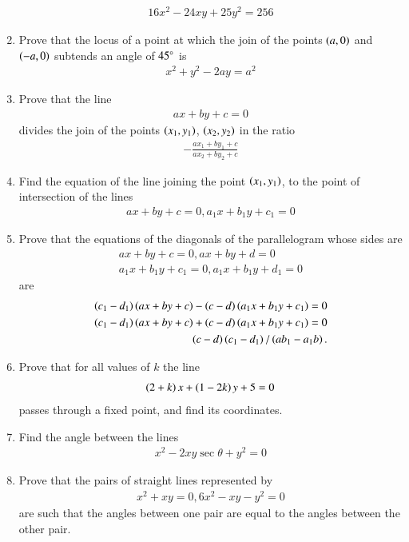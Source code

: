 \begin{enumerate}[1.]
\begin{align*}
16x^2-24xy+25y^2 = 256
\end{align*}
\item Prove that the locus of a point at which the join of the points $\left(a,0\right)$ and $\left(-a,0\right)$ subtends an angle of $45\degree$ is
\begin{align*}
x^2+y^2-2ay = a^2
\end{align*}
\item Prove that the line
\begin{align*}
ax+by+c=0
\end{align*}
divides the join of the points $\left(x_1,y_1\right)$, $\left(x_2,y_2\right)$ in the ratio
\begin{align*}
-\frac{ax_1+by_1+c}{ax_2+by_2+c}
\end{align*}
\item Find the equation of the line joining the point $\left(x_1,y_1\right)$, to the point of intersection of the lines
\begin{align*}
ax+by+c = 0, a_1x+b_1y+c_1 = 0
\end{align*}
\item Prove that the equations of the diagonals of the parallelogram whose sides are
\begin{align*}
ax+by+c = 0, ax+by+d = 0
\\
a_1x+b_1y+c_1 = 0, a_1x+b_1y+d_1 = 0
\end{align*}
are
{\small
\begin{align*}
\left(c_1-d_1\right)\left(ax+by+c\right)-\left(c-d\right)\left(a_1x+b_1y+c_1\right) = 0
\\
\left(c_1-d_1\right)\left(ax+by+c\right)+\left(c-d\right)\left(a_1x+b_1y+c_1\right) = 0
\\
\left(c-d\right)\left(c_1-d_1\right)/\left(ab_1-a_1b\right).
\end{align*}
}
\item Prove that for all values of $k$ the line
\begin{align*}
\left(2+k\right)x+\left(1-2k\right)y + 5 = 0
\end{align*}
passes through a fixed point, and find its coordinates.
\item Find the angle between the lines
\begin{align*}
x^2 - 2xy \sec \theta + y^2 = 0
\end{align*}
\item Prove that the pairs of straight lines represented by
\begin{align*}
x^2+xy = 0, 6x^2-xy-y^2 = 0
\end{align*}
are such that the angles between one pair are equal to the angles between the other pair.

\end{enumerate}
